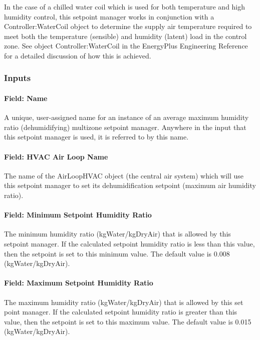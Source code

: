 In the case of a chilled water coil which is used for both temperature and high humidity control, this setpoint manager works in conjunction with a Controller:WaterCoil object to determine the supply air temperature required to meet both the temperature (sensible) and humidity (latent) load in the control zone. See object Controller:WaterCoil in the EnergyPlus Engineering Reference for a detailed discussion of how this is achieved.

\subsubsection{Inputs}\label{inputs-17-007}

\paragraph{Field: Name}\label{field-name-17-006}

A unique, user-assigned name for an instance of an average maximum humidity ratio (dehumidifying) multizone setpoint manager. Anywhere in the input that this setpoint manager is used, it is referred to by this name.

\paragraph{Field: HVAC Air Loop Name}\label{field-hvac-air-loop-name-7}

The name of the AirLoopHVAC object (the central air system) which will use this setpoint manager to set its dehumidification setpoint (maximum air humidity ratio).

\paragraph{Field: Minimum Setpoint Humidity Ratio}\label{field-minimum-setpoint-humidity-ratio-2}

The minimum humidity ratio (kgWater/kgDryAir) that is allowed by this setpoint manager. If the calculated setpoint humidity ratio is less than this value, then the setpoint is set to this minimum value. The default value is 0.008 (kgWater/kgDryAir).

\paragraph{Field: Maximum Setpoint Humidity Ratio}\label{field-maximum-setpoint-humidity-ratio-2}

The maximum humidity ratio (kgWater/kgDryAir) that is allowed by this set point manager. If the calculated setpoint humidity ratio is greater than this value, then the setpoint is set to this maximum value. The default value is 0.015 (kgWater/kgDryAir).

